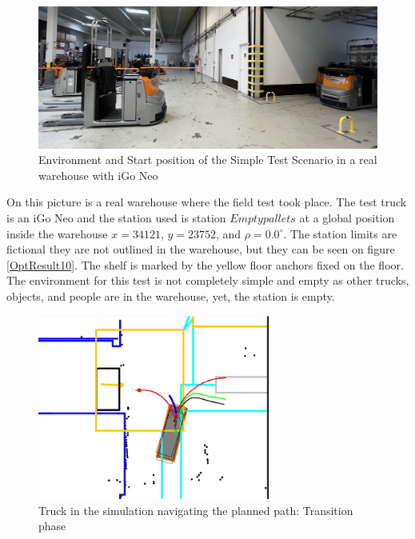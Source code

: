 \begin{figure}[H]
    \begin{center}
        \includegraphics[width=5in]{images/Chap3/Start_Sc1.jpg} %
        \caption{Environment and Start position of the Simple Test Scenario in a real warehouse
        with iGo Neo}
        \label{OptResult11}
        \end{center}    
\end{figure}

On this picture is a real warehouse where the field test took place.
The test truck is an iGo Neo and the station used is station \(Empty pallets\) at a 
global position inside the warehouse \(x = 34121\), \(y = 23752\), and \(\rho = 0.0^\circ\).
The station limits are fictional they are not outlined in the warehouse, 
but they can be seen on figure \ref{OptResult10}.
The shelf is marked by the yellow floor anchors fixed on the floor.
The environment for this test is not completely simple and empty as 
other trucks, objects, and people are in the warehouse, yet, the station is 
empty. 

\begin{figure}[H]
    \begin{center}
        \includegraphics[width=3in]{images/Chap3/Test1_transition.png} %
        \caption{Truck in the simulation navigating the planned path: Transition phase}
        \label{OptResult50}
        \end{center}    
\end{figure}


